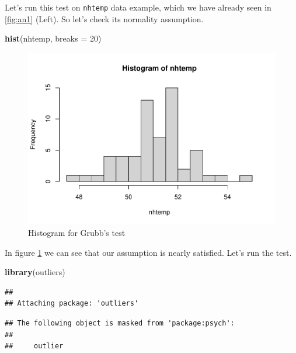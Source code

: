 \documentclass[
]{book}
\newenvironment{Shaded}{\begin{snugshade}}{\end{snugshade}}
\newcommand{\AttributeTok}[1]{\textcolor[rgb]{0.13,0.29,0.53}{#1}}
\newcommand{\DecValTok}[1]{\textcolor[rgb]{0.00,0.00,0.81}{#1}}
\newcommand{\FunctionTok}[1]{\textcolor[rgb]{0.13,0.29,0.53}{\textbf{#1}}}
\newcommand{\NormalTok}[1]{#1}
\begin{document}
Let's run this test on \texttt{nhtemp} data example, which we have already seen in \ref{fig:an1} (Left). So let's check its normality assumption.

\begin{Shaded}
\begin{Highlighting}[]
\FunctionTok{hist}\NormalTok{(nhtemp, }\AttributeTok{breaks =} \DecValTok{20}\NormalTok{)}
\end{Highlighting}
\end{Shaded}

\begin{figure}

{\centering \includegraphics[height=0.27\textheight]{DauR_files/figure-latex/an3-1} 

}

\caption{Histogram for Grubb's test}\label{fig:an3}
\end{figure}

In figure \ref{fig:an3} we can see that our assumption is nearly satisfied. Let's run the test.

\begin{Shaded}
\begin{Highlighting}[]
\FunctionTok{library}\NormalTok{(outliers)}
\end{Highlighting}
\end{Shaded}

\begin{verbatim}
## 
## Attaching package: 'outliers'
\end{verbatim}

\begin{verbatim}
## The following object is masked from 'package:psych':
## 
##     outlier
\end{verbatim}
\end{document}
